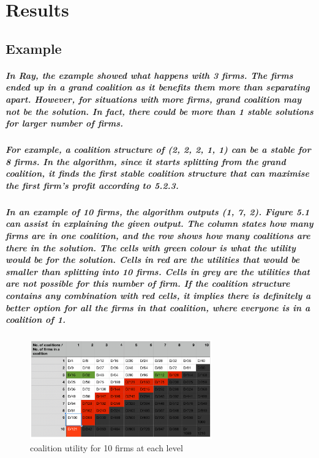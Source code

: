 \documentclass[11pt]{report}
\begin{document}
\chapter{Results}
\section{Example}
\paragraph{In Ray\cite{ray2007coalitionformation}, the example showed what happens with 3 firms. The firms ended up in a grand coalition as it benefits them more than separating apart. However, for situations with more firms, grand coalition may not be the solution. In fact, there could be more than 1 stable solutions for larger number of firms. }
\paragraph{For example, a coalition structure of (2, 2, 2, 1, 1) can be a stable for 8 firms. In the algorithm, since it starts splitting from the grand coalition, it finds the first stable coalition structure that can maximise the first firm's profit according to 5.2.3.}
\paragraph{In an example of 10 firms, the algorithm outputs (1, 7, 2). Figure 5.1 can assist in explaining the given output. The column states how many firms are in one coalition, and the row shows how many coalitions are there in the solution. The cells with green colour is what the utility would be for the solution. Cells in red are the utilities that would be smaller than splitting into 10 firms. Cells in grey are the utilities that are not possible for this number of firm. If the coalition structure contains any combination with red cells, it implies there is definitely a better option for all the firms in that coalition, where everyone is in a coalition of 1. }


\begin{figure}
	\centering
	\includegraphics[width=0.7\textwidth]{images/coalition.jpeg}
	\caption{coalition utility for 10 firms at each level}
\end{figure}
\end{document}
